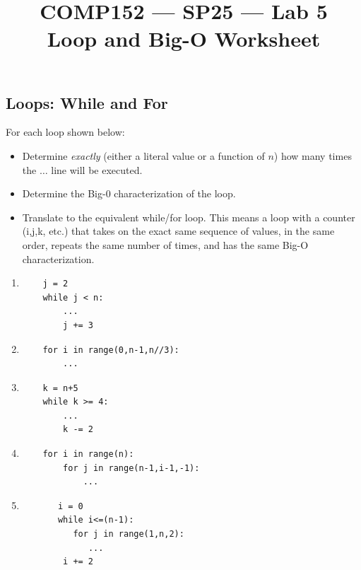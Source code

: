 \documentclass[10pt]{article}
\title{COMP152 --- SP25 --- Lab 5 \\ Loop and Big-O Worksheet}
\author{}
\begin{document}
\maketitle

\thispagestyle{empty}
\subsection*{Loops: While and For}

For each loop shown below:
\begin{itemize}
    \item Determine \textit{exactly} (either a literal value or a function of $n$) how many times the $\ldots$ line will be executed.
    \item Determine the Big-0 characterization of the loop. 
    \item Translate to the equivalent while/for loop. This means a loop with a counter (i,j,k, etc.) that takes on the exact same sequence of values, in the same order, repeats the same number of times, and has the same Big-O characterization.
\end{itemize}

\begin{enumerate}
    \item 
    \begin{verbatim}
    j = 2
    while j < n:
        ...
        j += 3
    \end{verbatim}
    \vspace{2in}
    \item
    \begin{verbatim}
    for i in range(0,n-1,n//3):
        ...
    \end{verbatim}
    \newpage \thispagestyle{empty}
    \item
    \begin{verbatim}
    k = n+5
    while k >= 4:
        ...
        k -= 2
    \end{verbatim}
    \vspace{2in}
    \item
    \begin{verbatim}
    for i in range(n):
        for j in range(n-1,i-1,-1):
            ...
    \end{verbatim}
    \vspace{3in}
    \item 
    \begin{verbatim}
       i = 0
       while i<=(n-1):
          for j in range(1,n,2):
             ...
        i += 2
    \end{verbatim}
\end{enumerate}
\newpage \thispagestyle{empty}
\end{document}
